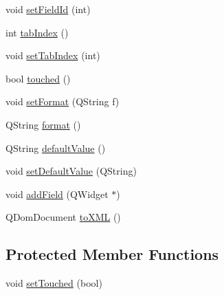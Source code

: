 \begin{DoxyCompactItemize}
\item 
void \hyperlink{classFormField_a6da3ec71e2e22b2eca8151c08663f0d2}{setFieldId} (int)
\item 
int \hyperlink{classFormField_a9296ae3d1322bce37f7606cd4ba063ce}{tabIndex} ()
\item 
void \hyperlink{classFormField_a860545288d309640181ff72a031073e0}{setTabIndex} (int)
\item 
bool \hyperlink{classFormField_ae1d2052bc5a3ac7a387ada02c9468cfe}{touched} ()
\item 
void \hyperlink{classFormField_a9888cc6ba39d58222ca63f15a439c038}{setFormat} (QString f)
\item 
QString \hyperlink{classFormField_aa46924cdfef9aff52746c5e288c3fe39}{format} ()
\item 
QString \hyperlink{classFormField_acf9200a7add35df526f73b3b6979196f}{defaultValue} ()
\item 
void \hyperlink{classFormField_a847edff4ea53c51206b7647156ac35e0}{setDefaultValue} (QString)
\item 
void \hyperlink{classFormField_a9e7ab4c532d7445e3bb17ce91b4edd2f}{addField} (QWidget $\ast$)
\item 
QDomDocument \hyperlink{classFormField_a687303cd0e40108fa62becf42ae36afa}{toXML} ()
\end{DoxyCompactItemize}
\subsection*{Protected Member Functions}
\begin{DoxyCompactItemize}
\item 
void \hyperlink{classFormField_a95d519466092fca7255ef0fe02551b99}{setTouched} (bool)
\end{DoxyCompactItemize}
